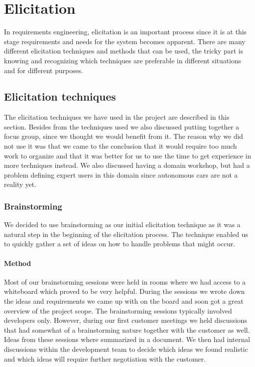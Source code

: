 \documentclass[10pt]{article}
\begin{document}
\section{Elicitation}
\sloppy
\noindent
In requirements engineering, elicitation is an important process since it is at this stage requirements and needs for the system becomes apparent. There are many different elicitation techniques and methods that can be used, the tricky part is knowing and recognizing which techniques are preferable in different situations and for different purposes.

\subsection{Elicitation techniques}
The elicitation techniques we have used in the project are described in this section. Besides from the techniques used we also discussed putting together a focus group, since we thought we would benefit from it. The reason why we did not use it was that we came to the conclusion that it would require too much work to organize and that it was better for us to use the time to get experience in more techniques instead. We also discussed having a domain workshop, but had a problem defining expert users in this domain since autonomous cars are not a reality yet.

\subsubsection{Brainstorming}
We decided to use brainstorming as our initial elicitation technique as it was a natural step in the beginning of the elicitation process. The technique enabled us to quickly gather a set of ideas on how to handle problems that might occur.

\paragraph{Method}
\hfill \break
Most of our brainstorming sessions were held in rooms where we had access to a whiteboard which proved to be very helpful. During the sessions we wrote down the ideas and requirements we came up with on the board and soon got a great overview of the project scope. The brainstorming sessions typically involved developers only. However, during our first customer meetings we held discussions that had somewhat of a brainstorming nature together with the customer as well. Ideas from these sessions where summarized in a document. We then had internal discussions within the development team to decide which ideas we found realistic and which ideas will require further negotiation with the customer.
\end{document}
